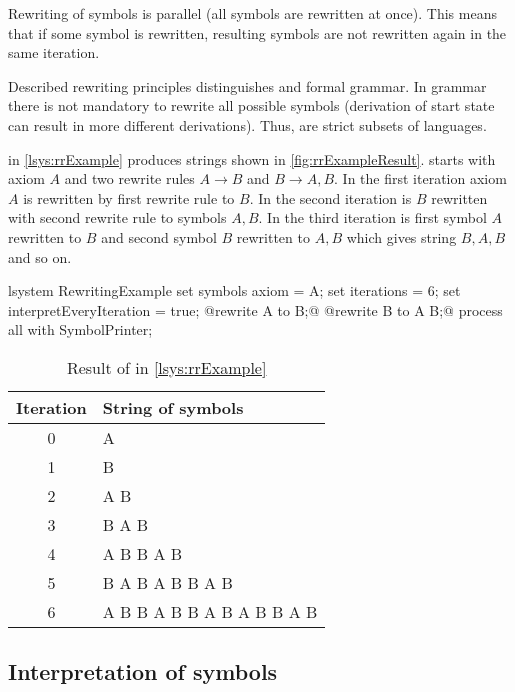 Rewriting of symbols is parallel (all symbols are rewritten at once).
This means that if some symbol is rewritten, resulting symbols are not rewritten again in the same iteration.

Described rewriting principles distinguishes \lsystem and formal grammar.
In grammar there is not mandatory to rewrite all possible symbols (derivation of start state can result in more different derivations).
Thus, \lsystems are strict subsets of languages.

\lsystem in \autoref{lsys:rrExample} produces strings shown in \autoref{fig:rrExampleResult}.
\lsystem starts with axiom $A$ and two rewrite rules $A \rightarrow B$ and $B \rightarrow A, B$.
In the first iteration axiom $A$ is rewritten by first rewrite rule to $B$.
In the second iteration is $B$ rewritten with second rewrite rule to symbols $A, B$.
In the third iteration is first symbol $A$ rewritten to $B$ and second symbol $B$ rewritten to $A, B$ which gives string $B, A, B$ and so on.

\begin{Lsystem}[label=lsys:rrExample,caption={Simple \lsystem as example of rewriting principles}]
lsystem RewritingExample {
	set symbols axiom = A;
	set iterations = 6;
	set interpretEveryIteration = true;
	@rewrite A to B;@
	@rewrite B to A B;@
}
process all with SymbolPrinter;
\end{Lsystem}

\begin{table}[h]
	\centering
	\begin{tabular}{c l}
   		\toprule
   		Iteration & String of symbols \\
   		\midrule
		0 & A \\
		1 & B \\
		2 & A B \\
		3 & B A B \\
		4 & A B B A B \\
		5 & B A B A B B A B \\
		6 & A B B A B B A B A B B A B \\
		\bottomrule
	\end{tabular}
	\caption{Result of \lsystem in \autoref{lsys:rrExample}}
	\label{fig:rrExampleResult}
\end{table}


\subsection{Interpretation of \lsystem symbols}

